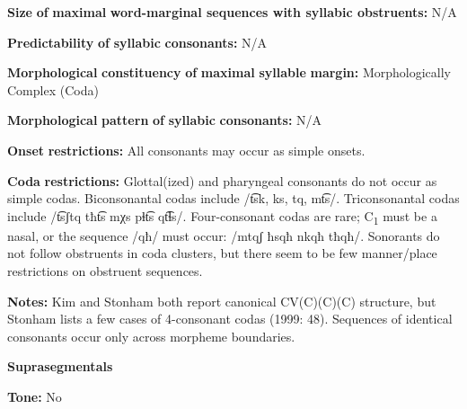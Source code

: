 \begin{styleBody}
\textbf{Size} \textbf{of} \textbf{maximal} \textbf{word{}-marginal sequences with syllabic obstruents:} N/A
\end{styleBody}

\begin{styleBody}
\textbf{Predictability} \textbf{of} \textbf{syllabic} \textbf{consonants:} N/A
\end{styleBody}

\begin{styleBody}
\textbf{Morphological} \textbf{constituency} \textbf{of} \textbf{maximal} \textbf{syllable} \textbf{margin:} Morphologically Complex (Coda)
\end{styleBody}

\begin{styleBody}
\textbf{Morphological} \textbf{pattern} \textbf{of} \textbf{syllabic} \textbf{consonants:} N/A
\end{styleBody}

\begin{styleBody}
\textbf{Onset} \textbf{restrictions:} All consonants may occur as simple onsets.
\end{styleBody}

\begin{styleBody}
\textbf{Coda} \textbf{restrictions:} Glottal(ized) and pharyngeal consonants do not occur as simple codas. Biconsonantal codas include /t͡sk, ks, tq, mt͡s/. Triconsonantal codas include /t͡sʃtq tħt͡s mχs pɬt͡s qt͡ɬs/. Four-consonant codas are rare; C\textsubscript{1} must be a nasal, or the sequence /qħ/ must occur: /mtqʃ ħsqħ nkqħ tħqħ/. Sonorants do not follow obstruents in coda clusters, but there seem to be few manner/place restrictions on obstruent sequences.
\end{styleBody}

\begin{styleBody}
\textbf{Notes:} Kim and Stonham both report canonical CV(C)(C)(C) structure, but Stonham lists a few cases of 4-consonant codas (1999: 48). Sequences of identical consonants occur only across morpheme boundaries.
\end{styleBody}

\begin{styleBody}
\textbf{Suprasegmentals}
\end{styleBody}

\begin{styleBody}
\textbf{Tone:} No
\end{styleBody}

